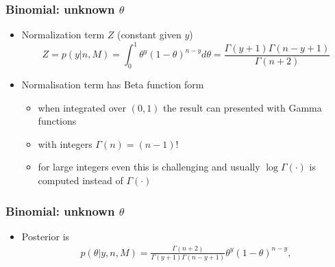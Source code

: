\documentclass[english,t]{beamer}
\renewcommand{\emph}[1]{\textcolor{navyblue}{#1}}
\begin{document}
\begin{frame}
  \frametitle{Binomial: unknown $\theta$}

  \begin{itemize}
  \item Normalization term $Z$ (constant given $y$)
    \begin{equation*}
      Z=p(y|n,M)= \int_0^1 \theta^y(1-\theta)^{n-y} d\theta = \frac{\Gamma(y+1)\Gamma(n-y+1)}{\Gamma(n+2)}
    \end{equation*}
  \item Normalisation term has \emph{Beta} function form 
    \begin{itemize}
    \item when integrated over $(0,1)$
      the result can presented with Gamma functions
    \item with integers  $\Gamma(n)=(n-1)!$
    \item for large integers even this is challenging and usually
      $\log \Gamma(\cdot)$ is computed instead of $\Gamma(\cdot)$
    \end{itemize}
  \end{itemize}

\end{frame}

\begin{frame}
  \frametitle{Binomial: unknown $\theta$}

  \begin{itemize}
  \item Posterior is
    \begin{align*}
      p(\theta|y,n,M) = \frac{\Gamma(n+2)}{\Gamma(y+1)\Gamma(n-y+1)}\theta^y(1-\theta)^{n-y},
    \end{align*}
  \end{itemize}
  \vspace{0.5\baselineskip}
  \begin{center}
  \end{center}
\end{frame}
\end{document}
